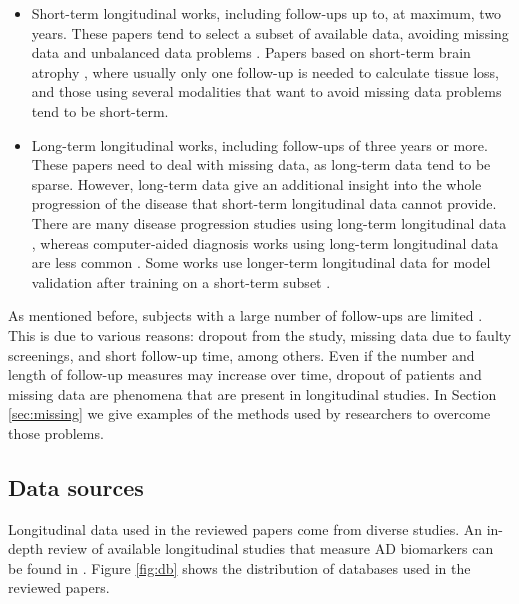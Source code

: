 \begin{itemize}\itemsep7pt

\item Short-term longitudinal works, including follow-ups up to, at maximum, two years. These papers tend to select a subset of available data, avoiding missing data and unbalanced data problems \cite{Ardekani2016,Fiot2012,Fiot2014,Gray2012,Rodrigues2014,Shi2015,Shi2017}. Papers based on short-term brain atrophy \cite{Huang2012,Hyun2016,McEvoy2011,Sanroma2017,Vounou2012}, where usually only one follow-up is needed to calculate tissue loss, and those using several modalities that want to avoid missing data problems \cite{Chen2011b,Hinrichs2011,Jack2009} tend to be short-term.

\item Long-term longitudinal works, including follow-ups of three years or more. These papers need to deal with missing data, as long-term data tend to be sparse. However, long-term data give an additional insight into the whole progression of the disease that short-term longitudinal data cannot provide. There are many disease progression studies using long-term longitudinal data \cite{Desikan2011,Guillaume2014,Guerrero2016,Bilgel2015a,Bilgel2016,Iturria-Medina2016,Li2017b,Aghili2018}, whereas computer-aided diagnosis works using long-term longitudinal data are less common \cite{Chi2017,Minhas2016}. Some works use longer-term longitudinal data for model validation after training on a short-term subset \cite{Young2015a}.
\end{itemize}

As mentioned before, subjects with a large number of follow-ups are limited \cite{Lawrence2017}. This is due to various reasons: dropout from the study, missing data due to faulty screenings, and short follow-up time, among others. Even if the number and length of follow-up measures may increase over time, dropout of patients and missing data are phenomena that are present in longitudinal studies. In Section \ref{sec:missing} we give examples of the methods used by researchers to overcome those problems. \\

\subsection{Data sources}

Longitudinal data used in the reviewed papers come from diverse studies. An in-depth review of available longitudinal studies that measure AD biomarkers can be found in \cite{Lawrence2017}. Figure \ref{fig:db} shows the distribution of databases used in the reviewed papers.  \\

